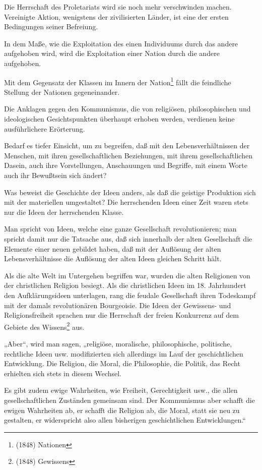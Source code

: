 \documentclass[letterpaper]{article}
\begin{document}
Die Herrschaft des Proletariats wird sie noch mehr verschwinden machen. Vereinigte Aktion, wenigstens der zivilisierten Länder, ist eine der ersten Bedingungen seiner Befreiung.

In dem Maße, wie die Exploitation des einen Individuums durch das andere aufgehoben wird, wird die Exploitation einer Nation durch die andere aufgehoben.

Mit dem Gegensatz der Klassen im Innern der Nation\footnote{(1848) Nationen} fällt die feindliche Stellung der Nationen gegeneinander.

Die Anklagen gegen den Kommunismus, die von religiösen, philosophischen und ideologischen Gesichtspunkten überhaupt erhoben werden, verdienen keine ausführlichere Erörterung.

Bedarf es tiefer Einsicht, um zu begreifen, daß mit den Lebensverhältnissen der Menschen, mit ihren gesellschaftlichen Beziehungen, mit ihrem gesellschaftlichen Dasein, auch ihre Vorstellungen, Anschauungen und Begriffe, mit einem Worte auch ihr Bewußtsein sich ändert?

Was beweist die Geschichte der Ideen anders, als daß die geistige Produktion sich mit der materiellen umgestaltet? Die herrschenden Ideen einer Zeit waren stets nur die Ideen der herrschenden Klasse.

Man spricht von Ideen, welche eine ganze Gesellschaft revolutionieren; man spricht damit nur die Tatsache aus, daß sich innerhalb der alten Gesellschaft die Elemente einer neuen gebildet haben, daß mit der Auflösung der alten Lebensverhältnisse die Auflösung der alten Ideen gleichen Schritt hält.

Als die alte Welt im Untergehen begriffen war, wurden die alten Religionen von der christlichen Religion besiegt. Als die christlichen Ideen im 18. Jahrhundert den Aufklärungsideen unterlagen, rang die feudale Gesellschaft ihren Todeskampf mit der damals revolutionären Bourgeoisie. Die Ideen der Gewissens- und Religionsfreiheit sprachen nur die Herrschaft der freien Konkurrenz auf dem Gebiete des Wissens\footnote{(1848) Gewissens} aus.

„Aber“, wird man sagen, „religiöse, moralische, philosophische, politische, rechtliche Ideen usw. modifizierten sich allerdings im Lauf der geschichtlichen Entwicklung. Die Religion, die Moral, die Philosophie, die Politik, das Recht erhielten sich stets in diesem Wechsel.

Es gibt zudem ewige Wahrheiten, wie Freiheit, Gerechtigkeit usw., die allen gesellschaftlichen Zuständen gemeinsam sind. Der Kommunismus aber schafft die ewigen Wahrheiten ab, er schafft die Religion ab, die Moral, statt sie neu zu gestalten, er widerspricht also allen bisherigen geschichtlichen Entwicklungen.“
\end{document}
